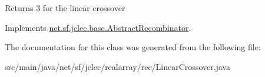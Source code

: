 \begin{DoxyReturn}{Returns}
3 for the linear crossover 
\end{DoxyReturn}


Implements \hyperlink{classnet_1_1sf_1_1jclec_1_1base_1_1_abstract_recombinator_a49a445f27d777d6f439d97d61f2e1729}{net.\-sf.\-jclec.\-base.\-Abstract\-Recombinator}.



The documentation for this class was generated from the following file\-:\begin{DoxyCompactItemize}
\item 
src/main/java/net/sf/jclec/realarray/rec/Linear\-Crossover.\-java\end{DoxyCompactItemize}
